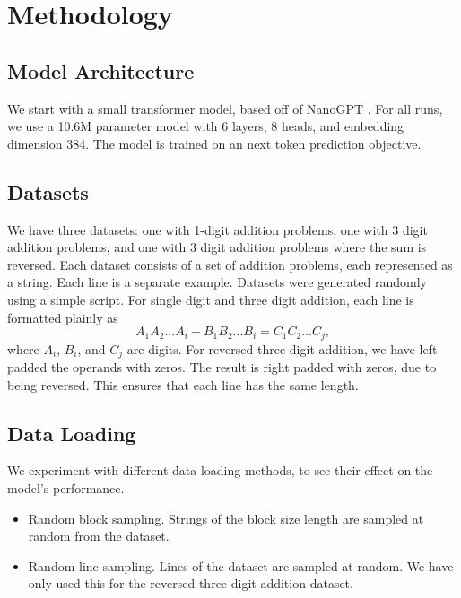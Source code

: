\documentclass[12pt]{article}
\begin{document}
\section{Methodology}
\subsection{Model Architecture}
We start with a small transformer model, based off of NanoGPT \cite{nanogpt}.
For all runs, we use a 10.6M parameter model with 6 layers, 8 heads, and embedding dimension 384.
The model is trained on an next token prediction objective. 
\subsection{Datasets}
We have three datasets: one with 1-digit addition problems, one with 3 digit addition problems, and one with 3 digit addition problems where the sum is reversed.
Each dataset consists of a set of addition problems, each represented as a string.
Each line is a separate example.
Datasets were generated randomly using a simple script.
For single digit and three digit addition, each line is formatted plainly as $$A_1A_2...A_i+B_1B_2...B_i=C_1C_2...C_j,$$
where $A_i$, $B_i$, and $C_j$ are digits.
For reversed three digit addition, we have left padded the operands with zeros. The result is right padded with zeros, due to being reversed.
This ensures that each line has the same length.
\subsection{Data Loading}
We experiment with different data loading methods, to see their effect on the model's performance.
\begin{itemize}
    \item Random block sampling. Strings of the block size length are sampled at random from the dataset.
    \item Random line sampling. Lines of the dataset are sampled at random. We have only used this for the reversed three digit addition dataset.
\end{itemize}
\end{document}
